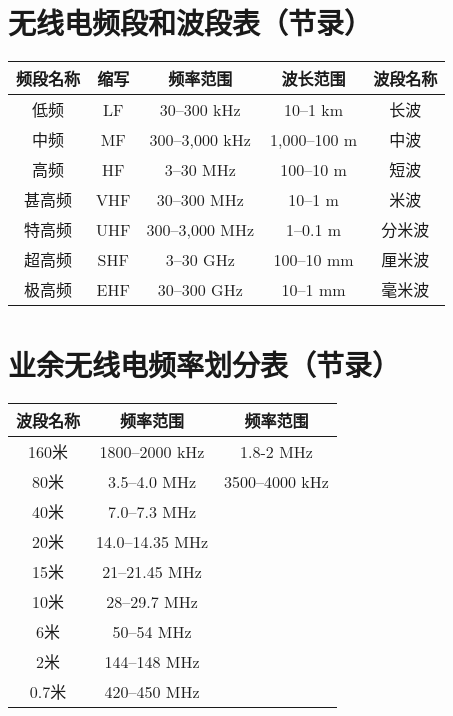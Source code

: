 \newpage

\section{无线电频段和波段表（节录）}

\begin{tabular}{|c|c|c|c|c|}
	\hline
	\textbf{频段名称} & \textbf{缩写} & \textbf{频率范围} & \textbf{波长范围} & \textbf{波段名称} \\
	\hline
	低频 & LF & 30–300 kHz & 10–1 km & 长波 \\
	\hline
	中频 & MF & 300–3,000 kHz & 1,000–100 m & 中波 \\
	\hline
	高频 & HF & 3–30 MHz & 100–10 m & 短波 \\
	\hline
	甚高频 & VHF & 30–300 MHz & 10–1 m & 米波 \\
	\hline
	特高频 & UHF & 300–3,000 MHz & 1–0.1 m & 分米波 \\
	\hline
	超高频 & SHF & 3–30 GHz & 100–10 mm & 厘米波 \\
	\hline
	极高频 & EHF & 30–300 GHz & 10–1 mm & 毫米波 \\
	\hline
\end{tabular}

\newpage






\section{业余无线电频率划分表（节录）}


\begin{tabular}{|c|c|c|}
	\hline
	\textbf{波段名称} & \textbf{频率范围} & \textbf{频率范围} \\
	\hline
	160米 & 1800–2000 kHz & 1.8-2 MHz \\
	\hline
	80米 & 3.5–4.0 MHz & 3500–4000 kHz \\
	\hline
	40米 & 7.0–7.3 MHz &  \\
	\hline
	20米 & 14.0–14.35 MHz & \\
	\hline
	15米 & 21–21.45 MHz & \\
	\hline
	10米 & 28–29.7 MHz & \\
	\hline
	6米 & 50–54 MHz & \\
	\hline
	2米 & 144–148 MHz & \\
	\hline
	0.7米 & 420–450 MHz & \\
	\hline
\end{tabular}

